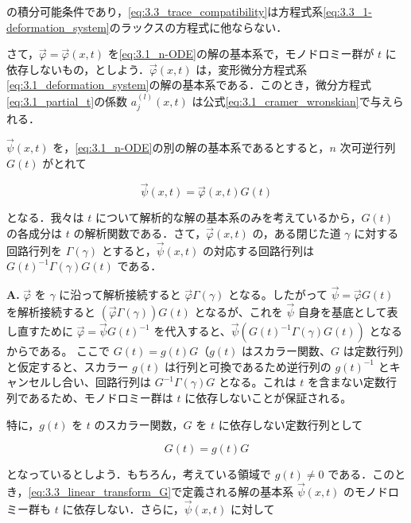 の積分可能条件であり，\eqref{eq:3.3_trace_compatibility}は方程式系\eqref{eq:3.3_1-deformation_system}のラックスの方程式に他ならない．

さて，$\vec{\varphi}=\vec{\varphi}(x,t)$ を\eqref{eq:3.1_n-ODE}の解の基本系で，モノドロミー群が $t$ に依存しないもの，としよう．$\vec{\varphi}(x,t)$ は，変形微分方程式系\eqref{eq:3.1_deformation_system}の解の基本系である．このとき，微分方程式\eqref{eq:3.1_partial_t}の係数 $a_j^{(l)}(x,t)$ は公式\eqref{eq:3.1_cramer_wronskian}で与えられる．

$\vec{\psi}(x,t)$ を，\eqref{eq:3.1_n-ODE}の別の解の基本系であるとすると，$n$ 次可逆行列 $G(t)$ がとれて

\begin{equation}\label{eq:3.3_linear_transform_G}
  \vec{\psi}(x,t) = \vec{\varphi}(x,t)G(t)
\end{equation}

となる．我々は $t$ について解析的な解の基本系のみを考えているから，$G(t)$ の各成分は $t$ の解析関数である．さて，$\vec{\varphi}(x,t)$ の，ある閉じた道 $\gamma$ に対する回路行列を $\Gamma(\gamma)$ とすると，$\vec{\psi}(x,t)$ の対応する回路行列は $G(t)^{-1}\Gamma(\gamma)G(t)$ である．

\begin{Q}[なぜ $\vec{\psi}$ の回路行列は $G(t)^{-1}\Gamma(\gamma)G(t)$ となり、$G(t)=g(t)G$ の形であればモノドロミー群は $t$ に依存しなくなるのか？]
\textbf{A.} $\vec{\varphi}$ を $\gamma$ に沿って解析接続すると $\vec{\varphi}\Gamma(\gamma)$ となる。したがって $\vec{\psi} = \vec{\varphi}G(t)$ を解析接続すると $(\vec{\varphi}\Gamma(\gamma))G(t)$ となるが、これを $\vec{\psi}$ 自身を基底として表し直すために $\vec{\varphi} = \vec{\psi}G(t)^{-1}$ を代入すると、$\vec{\psi} (G(t)^{-1}\Gamma(\gamma)G(t))$ となるからである。
ここで $G(t) = g(t)G$（$g(t)$ はスカラー関数、$G$ は定数行列）と仮定すると、スカラー $g(t)$ は行列と可換であるため逆行列の $g(t)^{-1}$ とキャンセルし合い、回路行列は $G^{-1}\Gamma(\gamma)G$ となる。これは $t$ を含まない定数行列であるため、モノドロミー群は $t$ に依存しないことが保証される。
\end{Q}

特に，$g(t)$ を $t$ のスカラー関数，$G$ を $t$ に依存しない定数行列として

\begin{equation}\label{eq:3.3_scalar_matrix_gG}
  G(t) = g(t)G
\end{equation}

となっているとしよう．もちろん，考えている領域で $g(t) \neq 0$ である．このとき，\eqref{eq:3.3_linear_transform_G}で定義される解の基本系 $\vec{\psi}(x,t)$ のモノドロミー群も $t$ に依存しない．さらに，$\vec{\psi}(x,t)$ に対して

